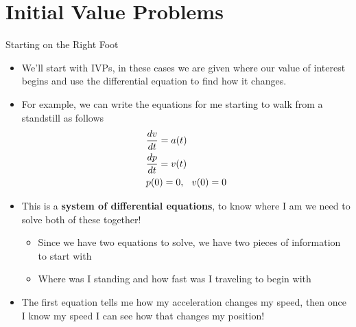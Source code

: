 {}\documentclass[letterpaper,
compress,
xcolor=x11names,
]{beamer}
\begin{document}
\section{Initial Value Problems}

\begin{frame}{Starting on the Right Foot}
	\footnotesize
	\begin{itemize}
		\item We'll start with IVPs, in these cases we are given where our value of interest begins and use the differential equation to find how it changes.
		\item For example, we can write the equations for me starting to walk from a standstill as follows
		\begin{align*}
			&\frac{dv}{dt} = a(t) \\
			&\frac{dp}{dt} = v(t) \\
			&p(0) = 0,\hspace{0.25cm} v(0) = 0
		\end{align*}
		\item This is a \textbf{system of differential equations}, to know where I am we need to solve both of these together!
		\begin{itemize}
			\item Since we have two equations to solve, we have two pieces of information to start with
			\item Where was I standing and how fast was I traveling to begin with
		\end{itemize}
		\item The first equation tells me how my acceleration changes my speed, then once I know my speed I can see how that changes my position!
	\end{itemize}
\end{frame}

\end{document}
